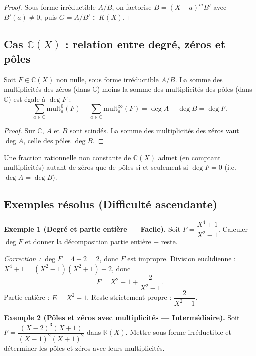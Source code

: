 \begin{proof}
Sous forme irréductible $A/B$, on factorise $B = (X - a)^m B'$ avec $B'(a) \neq 0$, puis $G = A/B' \in K(X)$.
\end{proof}

\subsection{Cas $\mathbb{C}(X)$ : relation entre degré, zéros et pôles}

\begin{theoreme}
Soit $F \in \mathbb{C}(X)$ non nulle, sous forme irréductible $A/B$. La somme des multiplicités des zéros (dans $\mathbb{C}$) moins la somme des multiplicités des pôles (dans $\mathbb{C}$) est égale à $\deg F$ :
\[ \sum_{a \in \mathbb{C}} \mathrm{mult}^0_a(F) - \sum_{a \in \mathbb{C}} \mathrm{mult}^\infty_a(F) = \deg A - \deg B = \deg F. \]
\end{theoreme}

\begin{proof}
Sur $\mathbb{C}$, $A$ et $B$ sont scindés. La somme des multiplicités des zéros vaut $\deg A$, celle des pôles $\deg B$.
\end{proof}

\begin{corollaire}
Une fraction rationnelle non constante de $\mathbb{C}(X)$ admet (en comptant multiplicités) autant de zéros que de pôles si et seulement si $\deg F = 0$ (i.e.\ $\deg A = \deg B$).
\end{corollaire}

\subsection{Exemples résolus (Difficulté ascendante)}

\textbf{Exemple 1 (Degré et partie entière --- Facile).}
Soit $F = \dfrac{X^4 + 1}{X^2 - 1}$. Calculer $\deg F$ et donner la décomposition partie entière + reste.

\textit{Correction :} $\deg F = 4 - 2 = 2$, donc $F$ est impropre. Division euclidienne :
$X^4 + 1 = (X^2 - 1)(X^2 + 1) + 2$, donc
\[ F = X^2 + 1 + \frac{2}{X^2 - 1}. \]
Partie entière : $E = X^2 + 1$. Reste strictement propre : $\dfrac{2}{X^2 - 1}$.

\medskip

\textbf{Exemple 2 (Pôles et zéros avec multiplicités --- Intermédiaire).}
Soit $F = \dfrac{(X - 2)^3 (X + 1)}{(X - 1)^2 (X + 1)^2}$ dans $\mathbb{R}(X)$. Mettre sous forme irréductible et déterminer les pôles et zéros avec leurs multiplicités.

